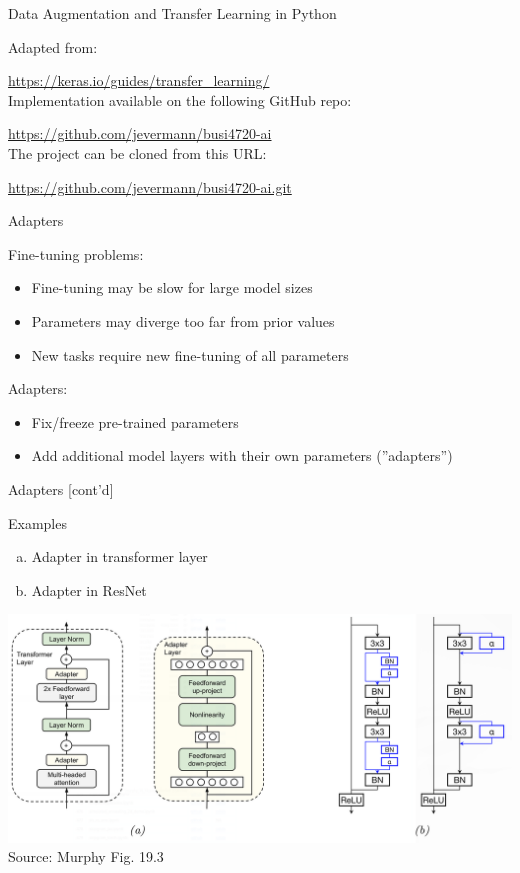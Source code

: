 \documentclass[ignorenonframetext,xcolor=x11names]{beamer}
\begin{document}
\begin{frame}{Data Augmentation and Transfer Learning in Python}

Adapted from: 

\small\url{https://keras.io/guides/transfer_learning/}\normalsize \\

Implementation available on the following GitHub repo:

\small\url{https://github.com/jevermann/busi4720-ai}\normalsize \\

The project can be cloned from this URL:

\small\url{https://github.com/jevermann/busi4720-ai.git}\normalsize
\end{frame}

\begin{frame}{Adapters}

\begin{block}{Fine-tuning problems:}
\begin{itemize}
\item Fine-tuning may be slow for large model sizes
\item Parameters may diverge too far from prior values
\item New tasks require new fine-tuning of all parameters
\end{itemize}
\end{block}

\begin{block}{Adapters:}
\begin{itemize}
\item Fix/freeze pre-trained parameters
\item Add additional model layers with their own parameters (''adapters'')
\end{itemize}
\end{block}
\end{frame}

\begin{frame}{Adapters \small [cont'd]}
\begin{block}{Examples}
  \begin{enumerate}[(a)]
     \item Adapter in transformer layer
     \item Adapter in ResNet
  \end{enumerate}
\end{block}

\centering
\includegraphics[width=\textwidth]{murphy_19_03.png} \\
\scriptsize Source: Murphy Fig. 19.3 \normalsize
\end{frame}
\end{document}
